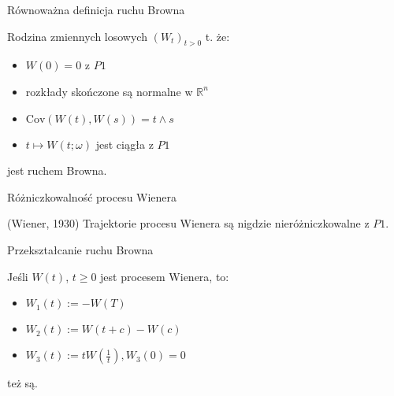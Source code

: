 \documentclass[avery5371,grid,frame]{flashcards}
\begin{document}
\begin{flashcard}[Twierdzenie]{Równoważna definicja ruchu Browna}

\smallskip
Rodzina zmiennych losowych $ \left( W_t \right) _{t > 0} $ t. że:
\begin{itemize}
\item $W(0) = 0$ z $P1$
\item rozkłady skończone są normalne w $\mathbb{R}^n$
\item $\text{Cov}(W(t), W(s)) = t \wedge s$
\item $t \mapsto W(t; \omega)$ jest ciągła z $P1$
\end{itemize}
jest ruchem Browna.
\end{flashcard}

\begin{flashcard}[Twierdzenie]{Różniczkowalność procesu Wienera}

\smallskip
(Wiener, 1930) Trajektorie procesu Wienera są nigdzie nieróżniczkowalne z $P1$.
\end{flashcard}

\begin{flashcard}[Twierdzenie]{Przekształcanie ruchu Browna}

\smallskip
Jeśli $W(t)$, $t \geq 0$ jest procesem Wienera, to:
\begin{itemize}
\item $W_1(t) := -W(T)$
\item $W_2(t) := W(t+c) - W(c)$
\item $W_3(t) := tW(\frac{1}{t}), W_3(0)=0$ 
\end{itemize}
też są.
\end{flashcard}

\begin{flashcard}[]{}
\end{flashcard}
\end{document}

